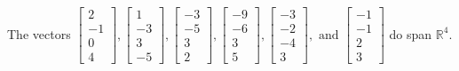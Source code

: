 \begin{exercise}
\begin{exerciseStatement}
  \end{exerciseStatement}
  \begin{exerciseAnswer}
   The vectors \(\left[\begin{array}{r}
2 \\
-1 \\
0 \\
4
\end{array}\right] , \left[\begin{array}{r}
1 \\
-3 \\
3 \\
-5
\end{array}\right] , \left[\begin{array}{r}
-3 \\
-5 \\
3 \\
2
\end{array}\right] , \left[\begin{array}{r}
-9 \\
-6 \\
3 \\
5
\end{array}\right] , \left[\begin{array}{r}
-3 \\
-2 \\
-4 \\
3
\end{array}\right] , \text{ and } \left[\begin{array}{r}
-1 \\
-1 \\
2 \\
3
\end{array}\right]\) 
  	 do  
	span \(\mathbb{R}^4\).
  


  \end{exerciseAnswer}
\end{exercise}
